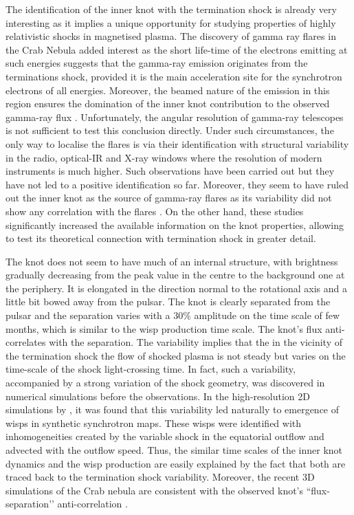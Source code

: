 The identification of the inner knot with the termination shock is already very interesting as it implies a unique opportunity for studying properties of highly relativistic shocks in magnetised plasma.  The discovery of gamma ray flares in the Crab Nebula added interest as the short life-time of the electrons emitting at such energies suggests that the gamma-ray emission originates from the terminations shock, provided it is the main acceleration site for the synchrotron electrons of all energies. Moreover, the beamed nature of the emission in this region ensures the domination of  the inner knot contribution to the observed 
gamma-ray flux \citep{ssk-lyut-11}.  Unfortunately, the angular resolution of gamma-ray telescopes is not sufficient to test this conclusion directly.  Under such circumstances, the only way to localise the flares is via their identification with structural variability in the radio, optical-IR and X-ray windows where the resolution of modern instruments is much higher. Such observations have been carried out but they have not led to a positive identification so far. Moreover, they seem to have ruled out the inner knot as the source of gamma-ray flares as its variability did not show any correlation with the flares \citep{Rudy-15}. On the other hand, these studies significantly  increased the available information on the knot properties, allowing to test its theoretical connection with termination shock in greater detail.      
    
The knot does not seem to have much of an internal structure, with brightness gradually decreasing from the peak value in the centre to the background one at the periphery. It is elongated in the direction normal to the rotational axis and a little bit bowed away from the pulsar. The knot is clearly separated from the pulsar and the separation varies with  a $30\%$ amplitude on the time scale of few months, which is similar to the wisp production time scale.   The knot’s flux anti-correlates with the separation.      
The variability implies that the in the vicinity of the termination shock the flow of shocked plasma is not steady but varies on the time-scale of the shock light-crossing time.  In fact, such a variability, accompanied by a strong variation of the shock geometry, was  discovered in numerical simulations before the observations. In the high-resolution 2D simulations by \citep{camus-09}, it was found that this variability led naturally to emergence of wisps in synthetic synchrotron maps.  These wisps were identified with inhomogeneities created by the variable shock in the  equatorial outflow and advected with the outflow speed.  Thus, the similar time scales of the inner knot dynamics and the wisp production are easily explained by the fact that both are traced back to the termination shock variability.  Moreover, the recent 3D simulations of the Crab nebula are consistent with the observed knot’s ``flux-separation’’ anti-correlation \citep{porth-14}.             

